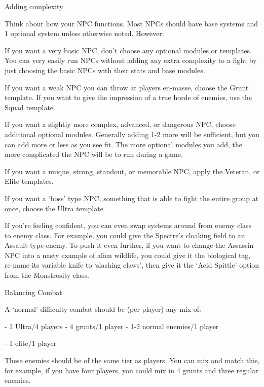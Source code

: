                                                                                                           


                                            Adding complexity  

Think about how your NPC functions. Most NPCs should have base systems and 1 optional  
system unless otherwise noted. However:
 

If you want a very basic NPC, don’t choose any optional modules or templates. You can very  
easily run NPCs without adding any extra complexity to a fight by just choosing the basic NPCs  
with their stats and base modules.
 

If you want a weak NPC you can throw at players en-masse, choose the Grunt template. If you  
want to give the impression of a true horde of enemies, use the Squad template.
 

If you want a slightly more complex, advanced, or dangerous NPC, choose additional optional  
modules. Generally adding 1-2 more will be sufficient, but you can add more or less as you see  
fit. The more optional modules you add, the more complicated the NPC will be to run during a  
game.
 

If you want a unique, strong, standout, or memorable NPC, apply the Veteran, or Elite templates.
 

If you want a ‘boss’ type NPC, something that is able to fight the entire group at once, choose  
the Ultra template
 

If you’re feeling confident, you can even swap systems around from enemy class to enemy class.  
For example, you could give the Spectre’s cloaking field to an Assault-type enemy. To push it  
even further, if you want to change the Assassin NPC into a nasty example of alien wildlife, you  
could give it the biological tag, re-name its variable knife to ‘slashing claws’, then give it the ‘Acid  
Spittle’ option from the Monstrosity class.
 

                                            Balancing Combat
 

A ‘normal’ difficulty combat should be (per player) any mix of:
 
    -   1 Ultra/4 players  
    -   4 grunts/1 player  
    -   1-2 normal enemies/1 player
 
    -   1 elite/1 player  

These enemies should be of the same tier as players. You can mix and match this, for example, if  
you have four players, you could mix in 4 grunts and three regular enemies.
 

